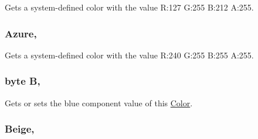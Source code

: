 Gets a system-\/defined color with the value R\+:127 G\+:255 B\+:212 A\+:255.

\hypertarget{structMicrosoft_1_1Xna_1_1Framework_1_1Color_ac41ebd9c2b2a6b82e2c489c4b2738362}{}
\subsubsection[{Azure}]{ Azure\hspace{0.3cm}{\ttfamily [static]}, {\ttfamily [get]}}\label{structMicrosoft_1_1Xna_1_1Framework_1_1Color_ac41ebd9c2b2a6b82e2c489c4b2738362}


Gets a system-\/defined color with the value R\+:240 G\+:255 B\+:255 A\+:255.

\hypertarget{structMicrosoft_1_1Xna_1_1Framework_1_1Color_af20775d9682d3bc9365ca7b2a6792298}{}
\subsubsection[{B}]{\setlength{\rightskip}{0pt plus 5cm}byte B\hspace{0.3cm}{\ttfamily [get]}, {\ttfamily [set]}}\label{structMicrosoft_1_1Xna_1_1Framework_1_1Color_af20775d9682d3bc9365ca7b2a6792298}


Gets or sets the blue component value of this \hyperlink{structMicrosoft_1_1Xna_1_1Framework_1_1Color}{Color}.

\hypertarget{structMicrosoft_1_1Xna_1_1Framework_1_1Color_a2fb95d3e28de67182b1205dec8a0b657}{}
\subsubsection[{Beige}]{ Beige\hspace{0.3cm}{\ttfamily [static]}, {\ttfamily [get]}}\label{structMicrosoft_1_1Xna_1_1Framework_1_1Color_a2fb95d3e28de67182b1205dec8a0b657}


